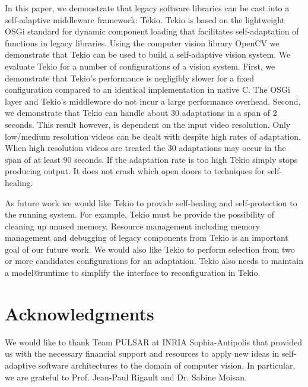 \documentclass{acm_proc_article-sp}
\begin{document}
In this paper, we demonstrate that legacy software libraries  can be cast into a self-adaptive middleware framework: Tekio. Tekio is based on the lightweight OSGi standard for dynamic component loading that facilitates self-adaptation of functions in legacy libraries. Using the computer vision library OpenCV we demonstrate that Tekio can be used to build a self-adaptive vision system. We evaluate Tekio for a number of configurations of a vision system. First, we demonstrate that Tekio's performance is negligibly slower for a fixed configuration compared to an identical implementation in native C. The OSGi layer and Tekio's middleware do not incur a large performance overhead. Second, we demonstrate that Tekio can handle about 30 adaptations in a span of 2 seconds. This result however, is dependent on the input video resolution. Only low/medium resolution videos can be dealt with despite high rates of adaptation. When high resolution videos are treated the 30 adaptations may occur in the span of at least 90 seconds. If the adaptation rate is too high Tekio simply stops producing output. It does not crash which open doors to techniques for self-healing.

As future work we would like Tekio  to provide self-healing and self-protection to the running system. For example, Tekio must be provide the possibility of cleaning up unused memory. Resource management including memory management and debugging of legacy components from Tekio is an important goal of our future work. We would also like Tekio to perform  selection from two or more  candidates configurations for an adaptation.  Tekio also needs to maintain a model@runtime to simplify the interface to reconfiguration in Tekio.

\section{Acknowledgments}
\label{sec:acknowledgments}
We would like to thank Team PULSAR at INRIA Sophia-Antipolis that provided us with the necessary financial support and resources to apply new ideas in self-adaptive software architectures to the  domain of computer vision. In particular, we are grateful to Prof. Jean-Paul Rigault and Dr. Sabine Moisan.



%

%
%
\end{document}
